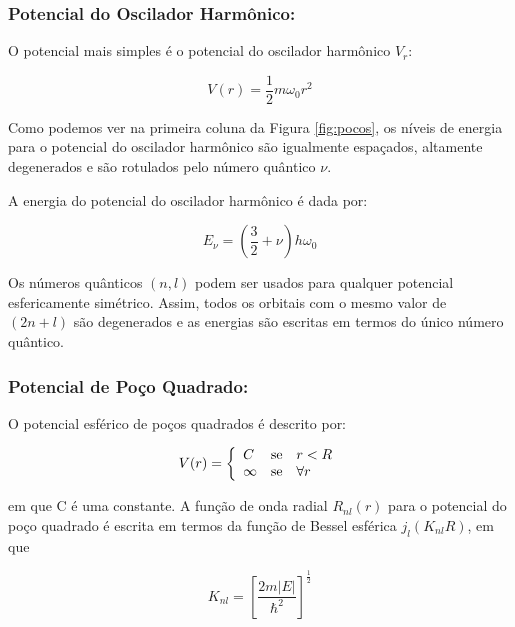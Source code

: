 \subsubsection{Potencial do Oscilador Harmônico:}

O potencial mais simples é o potencial do oscilador harmônico $V_{r}$:

\begin{equation}
    V(r)= \frac{1}{2}m\omega_0r^2
\end{equation}

Como podemos ver na primeira coluna da Figura \ref{fig:pocos}, os níveis de energia para o potencial do oscilador harmônico são igualmente espaçados, altamente degenerados  e são rotulados pelo número quântico $\nu$.


A energia do potencial do oscilador harmônico é dada por:

\begin{equation}
    E_{\nu}= \left(\frac{3}{2}+\nu\right)h\omega_0
\end{equation}

Os números quânticos $(n,l)$ podem ser usados para qualquer potencial esfericamente simétrico. Assim, todos os orbitais com o mesmo valor de $(2n+l)$ são degenerados e as energias são escritas em termos do único número quântico. 

\subsubsection{Potencial de Poço Quadrado:}

O potencial esférico de poços quadrados é descrito por:



\begin{equation}
 V(r) = \left\{\begin{array}{lll}
C & \hbox{se} & r < R \\
\infty & \hbox{se}  & \forall r
\end{array}\right.
\end{equation}



\noindent
em que C é uma constante. A função de onda radial $R_{nl}(r)$ para o potencial do poço quadrado é escrita em termos da função de Bessel esférica $j_{l}(K_{nl}R)$, em que

\begin{equation}
    K_{nl}=\left[\frac{2m|E|}{\hbar^2}\right]^{\frac{1}{2}}
\end{equation}

